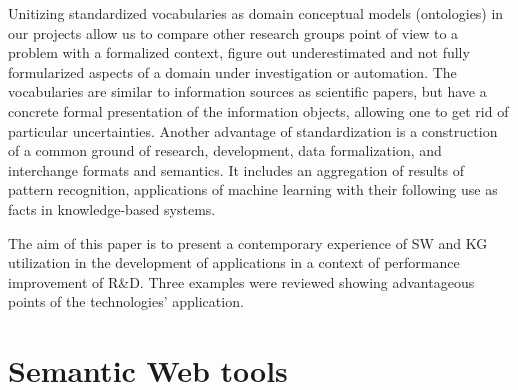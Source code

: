 \documentclass[
]{ceurart}
\begin{document}
Unitizing standardized vocabularies as domain conceptual models (ontologies) in our projects allow us to compare other research groups point of view to a problem with a formalized context, figure out underestimated and not fully formularized aspects of a domain under investigation or automation.  The vocabularies are similar to information sources as scientific papers, but have a concrete formal presentation of the information objects, allowing one to get rid of particular uncertainties.  Another advantage of standardization is a construction of a common ground of research, development, data formalization, and interchange formats and semantics.  It includes an aggregation of results of pattern recognition, applications of machine learning with their following use as facts in knowledge-based systems.

The aim of this paper is to present a contemporary experience of SW and KG utilization in the development of applications in a context of performance improvement of R\&D.  Three examples were reviewed showing advantageous points of the technologies' application.


\section{Semantic Web tools}
\label{sec:sw-tools}
\end{document}

